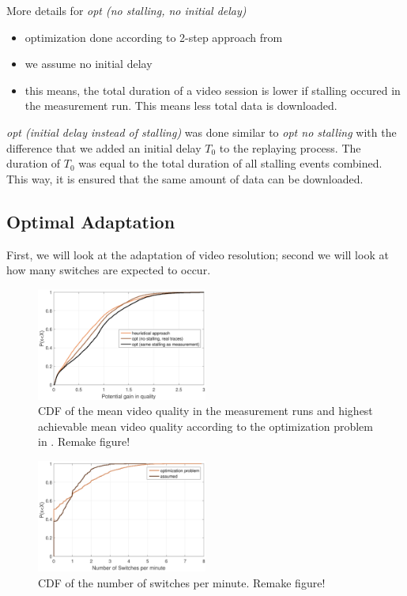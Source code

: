 More details for \textit{opt (no stalling, no initial delay)}
\begin{itemize}
\item optimization done according to 2-step approach from \cite{miller2013optimal}
\item we assume no initial delay
\item this means, the total duration of a video session is lower if stalling occured in the measurement run. This means less total data is downloaded.
\end{itemize}
\textit{opt (initial delay instead of stalling)} was done similar to \textit{opt no stalling} with the difference that we added an initial delay $T_0$ to the replaying process. The duration of $T_0$ was equal to the total duration of all stalling events combined. This way, it is ensured that the same amount of data can be downloaded.

\subsection{Optimal Adaptation}

First, we will look at the adaptation of video resolution; second we will look at how many switches are expected to occur.

\begin{figure}[t]
\centering
\includegraphics[width=0.5\textwidth]{figs/qualitygain}%
\caption{CDF of the mean video quality in the measurement runs and highest achievable mean video quality according to the optimization problem in \cite{hossfeld2015identifying}. Remake figure!}
\label{fig:opt}%
\end{figure}

\begin{figure}[t]
\centering
\includegraphics[width=0.5\textwidth]{figs/switches}%
\caption{CDF of the number of switches per minute. Remake figure!}
\label{fig:switches}%
\end{figure}

